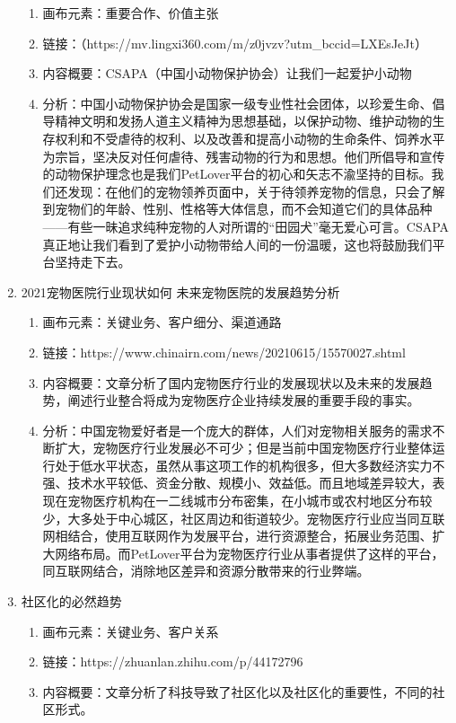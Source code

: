 \documentclass[a4paper]{ctexart}
\begin{document}
\begin{enumerate}[label=\alph*.]
\begin{enumerate}[label=\alph*.]
    \item 画布元素：重要合作、价值主张
    \item 链接：（https://mv.lingxi360.com/m/z0jvzv?utm\_bccid=LXEsJeJt）
    \item 内容概要：CSAPA（中国小动物保护协会）让我们一起爱护小动物
    \item 分析：中国小动物保护协会是国家一级专业性社会团体，以珍爱生命、倡导精神文明和发扬人道主义精神为思想基础，以保护动物、维护动物的生存权利和不受虐待的权利、以及改善和提高小动物的生命条件、饲养水平为宗旨，坚决反对任何虐待、残害动物的行为和思想。他们所倡导和宣传的动物保护理念也是我们PetLover平台的初心和矢志不渝坚持的目标。我们还发现：在他们的宠物领养页面中，关于待领养宠物的信息，只会了解到宠物们的年龄、性别、性格等大体信息，而不会知道它们的具体品种——有些一昧追求纯种宠物的人对所谓的“田园犬”毫无爱心可言。CSAPA真正地让我们看到了爱护小动物带给人间的一份温暖，这也将鼓励我们平台坚持走下去。
  \end{enumerate}
  \item 2021宠物医院行业现状如何 未来宠物医院的发展趋势分析
  \begin{enumerate}[label=\alph*.]
    \item 画布元素：关键业务、客户细分、渠道通路
    \item 链接：https://www.chinairn.com/news/20210615/15570027.shtml
    \item 内容概要：文章分析了国内宠物医疗行业的发展现状以及未来的发展趋势，阐述行业整合将成为宠物医疗企业持续发展的重要手段的事实。
    \item 分析：中国宠物爱好者是一个庞大的群体，人们对宠物相关服务的需求不断扩大，宠物医疗行业发展必不可少；但是当前中国宠物医疗行业整体运行处于低水平状态，虽然从事这项工作的机构很多，但大多数经济实力不强、技术水平较低、资金分散、规模小、效益低。而且地域差异较大，表现在宠物医疗机构在一二线城市分布密集，在小城市或农村地区分布较少，大多处于中心城区，社区周边和街道较少。宠物医疗行业应当同互联网相结合，使用互联网作为发展平台，进行资源整合，拓展业务范围、扩大网络布局。而PetLover平台为宠物医疗行业从事者提供了这样的平台，同互联网结合，消除地区差异和资源分散带来的行业弊端。
  \end{enumerate}
  \item 社区化的必然趋势
  \begin{enumerate}[label=\alph*.]
    \item 画布元素：关键业务、客户关系
    \item 链接：https://zhuanlan.zhihu.com/p/44172796
    \item 内容概要：文章分析了科技导致了社区化以及社区化的重要性，不同的社区形式。

\end{enumerate}
\end{enumerate}
\end{document}
